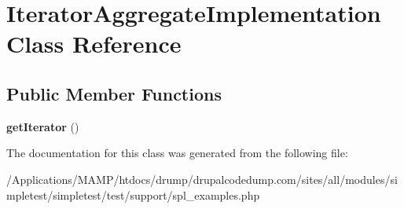 \hypertarget{class_iterator_aggregate_implementation}{
\section{IteratorAggregateImplementation Class Reference}
\label{class_iterator_aggregate_implementation}
}
\subsection*{Public Member Functions}
\begin{DoxyCompactItemize}
\item 
\hypertarget{class_iterator_aggregate_implementation_a59380b899b46ddfeb3690811baa9b27c}{
{\bfseries getIterator} ()}
\label{class_iterator_aggregate_implementation_a59380b899b46ddfeb3690811baa9b27c}

\end{DoxyCompactItemize}


The documentation for this class was generated from the following file:\begin{DoxyCompactItemize}
\item 
/Applications/MAMP/htdocs/drump/drupalcodedump.com/sites/all/modules/simpletest/simpletest/test/support/spl\_\-examples.php\end{DoxyCompactItemize}
